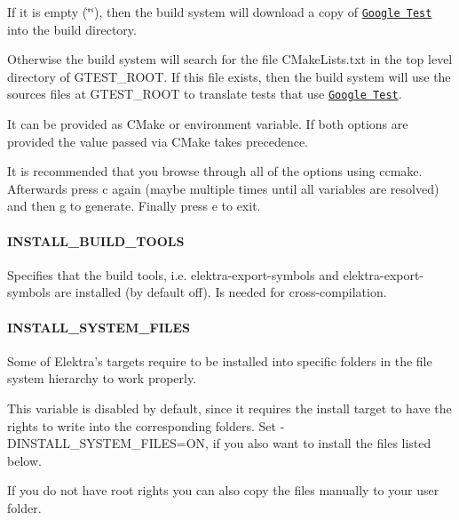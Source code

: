 \begin{DoxyItemize}
\item If it is empty ({\ttfamily \char`\"{}\char`\"{}}), then the build system will download a copy of \href{https://github.com/google/googletest}{\tt Google Test} into the build directory.
\item Otherwise the build system will search for the file {\ttfamily C\+Make\+Lists.\+txt} in the top level directory of {\ttfamily G\+T\+E\+S\+T\+\_\+\+R\+O\+OT}. If this file exists, then the build system will use the sources files at {\ttfamily G\+T\+E\+S\+T\+\_\+\+R\+O\+OT} to translate tests that use \href{https://github.com/google/googletest}{\tt Google Test}.
\end{DoxyItemize}

It can be provided as C\+Make or environment variable. If both options are provided the value passed via C\+Make takes precedence.

It is recommended that you browse through all of the options using {\ttfamily ccmake}. Afterwards press {\ttfamily c} again (maybe multiple times until all variables are resolved) and then {\ttfamily g} to generate. Finally press {\ttfamily e} to exit.

\paragraph*{{\ttfamily I\+N\+S\+T\+A\+L\+L\+\_\+\+B\+U\+I\+L\+D\+\_\+\+T\+O\+O\+LS}}

Specifies that the build tools, i.\+e. {\ttfamily elektra-\/export-\/symbols} and {\ttfamily elektra-\/export-\/symbols} are installed (by default off). Is needed for cross-\/compilation.

\paragraph*{{\ttfamily I\+N\+S\+T\+A\+L\+L\+\_\+\+S\+Y\+S\+T\+E\+M\+\_\+\+F\+I\+L\+ES}}

Some of Elektra’s targets require to be installed into specific folders in the file system hierarchy to work properly.

This variable is disabled by default, since it requires the install target to have the rights to write into the corresponding folders. Set {\ttfamily -\/\+D\+I\+N\+S\+T\+A\+L\+L\+\_\+\+S\+Y\+S\+T\+E\+M\+\_\+\+F\+I\+L\+ES=ON}, if you also want to install the files listed below.

If you do not have root rights you can also copy the files manually to your user folder.

